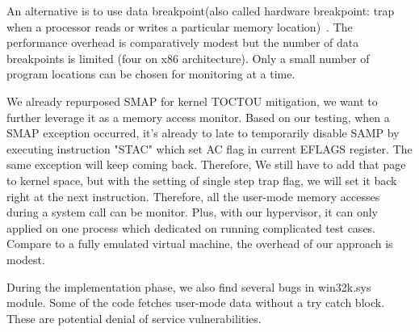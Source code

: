 An alternative is to use data breakpoint(also called hardware breakpoint: trap when a processor reads or writes a particular memory location)~\cite{erickson2010effective}. The performance overhead is comparatively modest but the number of data breakpoints is limited (four on x86 architecture). Only a small number of program locations can be chosen for monitoring at a time.



We already repurposed SMAP for kernel TOCTOU mitigation, we want to further leverage it as a memory access monitor. Based on our testing, when a SMAP exception occurred, it's already to late to temporarily disable SAMP by executing instruction "STAC" which set AC flag in current EFLAGS register. The same exception will keep coming back. Therefore, We still have to add that page to kernel space, but with the setting of single step trap flag, we will set it back right at the next instruction. Therefore, all the user-mode memory accesses during a system call can be monitor. Plus, with our hypervisor, it can only applied on one process which dedicated on running complicated test cases. Compare to a fully emulated virtual machine, the overhead of our approach is modest.

During the implementation phase, we also find several bugs in win32k.sys module. Some of the code fetches user-mode data without a try catch block. These are potential denial of service vulnerabilities.

